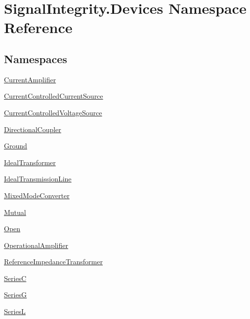 \hypertarget{namespaceSignalIntegrity_1_1Devices}{}\section{Signal\+Integrity.\+Devices Namespace Reference}
\label{namespaceSignalIntegrity_1_1Devices}
\subsection*{Namespaces}
\begin{DoxyCompactItemize}
\item 
 \hyperlink{namespaceSignalIntegrity_1_1Devices_1_1CurrentAmplifier}{Current\+Amplifier}
\item 
 \hyperlink{namespaceSignalIntegrity_1_1Devices_1_1CurrentControlledCurrentSource}{Current\+Controlled\+Current\+Source}
\item 
 \hyperlink{namespaceSignalIntegrity_1_1Devices_1_1CurrentControlledVoltageSource}{Current\+Controlled\+Voltage\+Source}
\item 
 \hyperlink{namespaceSignalIntegrity_1_1Devices_1_1DirectionalCoupler}{Directional\+Coupler}
\item 
 \hyperlink{namespaceSignalIntegrity_1_1Devices_1_1Ground}{Ground}
\item 
 \hyperlink{namespaceSignalIntegrity_1_1Devices_1_1IdealTransformer}{Ideal\+Transformer}
\item 
 \hyperlink{namespaceSignalIntegrity_1_1Devices_1_1IdealTransmissionLine}{Ideal\+Transmission\+Line}
\item 
 \hyperlink{namespaceSignalIntegrity_1_1Devices_1_1MixedModeConverter}{Mixed\+Mode\+Converter}
\item 
 \hyperlink{namespaceSignalIntegrity_1_1Devices_1_1Mutual}{Mutual}
\item 
 \hyperlink{namespaceSignalIntegrity_1_1Devices_1_1Open}{Open}
\item 
 \hyperlink{namespaceSignalIntegrity_1_1Devices_1_1OperationalAmplifier}{Operational\+Amplifier}
\item 
 \hyperlink{namespaceSignalIntegrity_1_1Devices_1_1ReferenceImpedanceTransformer}{Reference\+Impedance\+Transformer}
\item 
 \hyperlink{namespaceSignalIntegrity_1_1Devices_1_1SeriesC}{SeriesC}
\item 
 \hyperlink{namespaceSignalIntegrity_1_1Devices_1_1SeriesG}{SeriesG}
\item 
 \hyperlink{namespaceSignalIntegrity_1_1Devices_1_1SeriesL}{SeriesL}

\end{DoxyCompactItemize}

